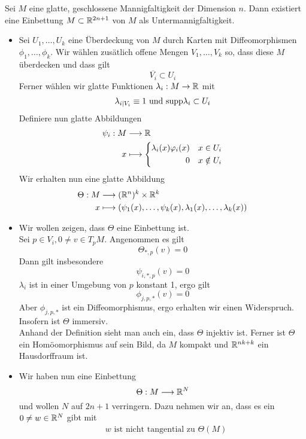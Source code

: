 Sei $M$ eine glatte, geschlossene Mannigfaltigkeit der Dimension $n$. Dann existiert eine Einbettung $M \subset \mathbb{R}^{2n+1}$ von $M$ als Untermannigfaltigkeit.
\begin{Beweis}{}
\begin{itemize}
	\item Sei $U_1, \ldots, U_k$ eine Überdeckung von $M$ durch Karten mit Diffeomorphismen $\phi_1,\ldots, \phi_k$. Wir wählen zusätlich offene Mengen $V_1,\ldots, V_k$ so, dass diese $M$ überdecken und dass gilt
	\[ \overline{V_i} \subset U_i \]
	Ferner wählen wir glatte Funktionen $\lambda_i : M \overset{}{\rightarrow} \mathbb{R}$ mit
	\begin{align*}
	\lambda_{i|V_i} \equiv 1 \text{  und  } \text{supp} \lambda_i \subset U_i
	\end{align*}
	Definiere nun glatte Abbildungen
	\begin{align*}
	\psi_i : M & \overset{}{\longrightarrow} \mathbb{R}\\
	x &\longmapsto \left\lbrace
	\begin{aligned}
	\lambda_i(x)\varphi_i(x) && x\in U_i\\
	0 && x \notin U_i
	\end{aligned}
	\right.
	\end{align*}
	Wir erhalten nun eine glatte Abbildung
	\begin{align*}
	\Theta : M &\overset{}{\longrightarrow} (\mathbb{R}^{n})^k \times \mathbb{R}^k\\
	x & \longmapsto (\psi_1(x), \ldots, \psi_k(x), \lambda_1(x), \ldots, \lambda_k(x))
	\end{align*}
	\item Wir wollen zeigen, dass $\Theta$ eine Einbettung ist.\\
	Sei $p \in V_i, 0\neq v \in T_pM$. Angenommen es gilt
	\[ \Theta_{*,p}(v) = 0 \]
	Dann gilt insbesondere
	\[ \psi_{i,*,p}(v) = 0 \]
	$\lambda_i$ ist in einer Umgebung von $p$ konstant 1, ergo gilt
	\[ \phi_{j,p,*}(v) = 0 \]
	Aber $\phi_{j,p,*}$ ist ein Diffeomorphismus, ergo erhalten wir einen Widerspruch. Insofern ist $\Theta$ immersiv.\\
	Anhand der Definition sieht man auch ein, dass $\Theta$ injektiv ist. Ferner ist $\Theta$ ein Homöomorphismus auf sein Bild, da $M$ kompakt und $\mathbb{R}^{nk + k}$ ein Hausdorffraum ist.
	\item Wir haben nun eine Einbettung
	\[ \Theta : M \overset{}{\longrightarrow} \mathbb{R}^N \]
	und wollen $N$ auf $2n+1$ verringern. Dazu nehmen wir an, dass es ein $0\neq w \in \mathbb{R}^N$ gibt mit
	\begin{align*}
	&w \text{ ist nicht tangential zu } \Theta(M)\\

\end{align*}
\end{itemize}
\end{Beweis}
